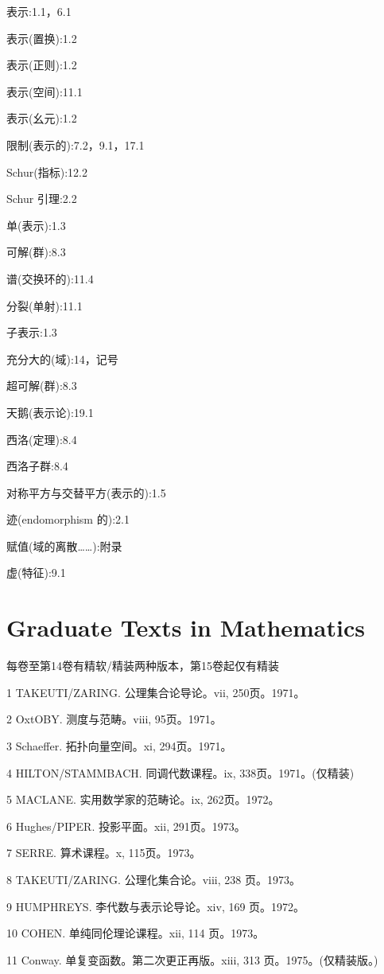 \documentclass[10pt]{article}
\begin{document}
表示:1.1，6.1

表示(置换):1.2

表示(正则):1.2

表示(空间):11.1

表示(幺元):1.2

限制(表示的):7.2，9.1，17.1

Schur(指标):12.2

Schur 引理:2.2

单(表示):1.3

可解(群):8.3

谱(交换环的):11.4

分裂(单射):11.1

子表示:1.3

充分大的(域):14，记号

超可解(群):8.3

天鹅(表示论):19.1

西洛(定理):8.4

西洛子群:8.4

对称平方与交替平方(表示的):1.5

迹(endomorphism 的):2.1

赋值(域的离散……):附录

虚(特征):9.1

\section*{Graduate Texts in Mathematics}

每卷至第14卷有精软/精装两种版本，第15卷起仅有精装

1 TAKEUTI/ZARING. 公理集合论导论。vii, 250页。1971。

2 OxtOBY. 测度与范畴。viii, 95页。1971。

3 Schaeffer. 拓扑向量空间。xi, 294页。1971。

4 HILTON/STAMMBACH. 同调代数课程。ix, 338页。1971。(仅精装)

5 MACLANE. 实用数学家的范畴论。ix, 262页。1972。

6 Hughes/PIPER. 投影平面。xii, 291页。1973。

7 SERRE. 算术课程。x, 115页。1973。

8 TAKEUTI/ZARING. 公理化集合论。viii, 238 页。1973。

9 HUMPHREYS. 李代数与表示论导论。xiv, 169 页。1972。

10 COHEN. 单纯同伦理论课程。xii, 114 页。1973。

11 Conway. 单复变函数。第二次更正再版。xiii, 313 页。1975。(仅精装版。)
\end{document}

